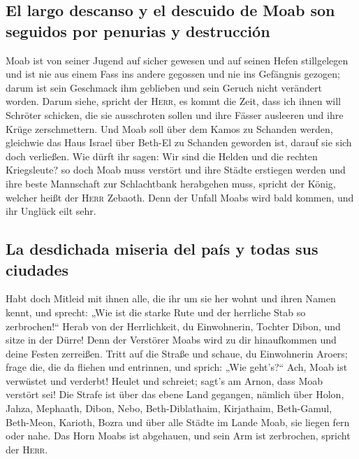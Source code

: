 \hypertarget{el-largo-descanso-y-el-descuido-de-moab-son-seguidos-por-penurias-y-destrucciuxf3n}{%
\subsection{El largo descanso y el descuido de Moab son seguidos por
penurias y
destrucción}\label{el-largo-descanso-y-el-descuido-de-moab-son-seguidos-por-penurias-y-destrucciuxf3n}}

 Moab ist von seiner Jugend auf sicher gewesen und auf
seinen Hefen stillgelegen und ist nie aus einem Fass ins andere gegossen
und nie ins Gefängnis gezogen; darum ist sein Geschmack ihm geblieben
und sein Geruch nicht verändert worden.  Darum siehe,
spricht der \textsc{Herr}, es kommt die Zeit, dass ich ihnen will
Schröter schicken, die sie ausschroten sollen und ihre Fässer ausleeren
und ihre Krüge zerschmettern.  Und Moab soll über dem
Kamos zu Schanden werden, gleichwie das Haus Israel über Beth-El zu
Schanden geworden ist, darauf sie sich doch verließen. 
Wie dürft ihr sagen: Wir sind die Helden und die rechten Kriegsleute?
 so doch Moab muss verstört und ihre Städte erstiegen
werden und ihre beste Mannschaft zur Schlachtbank herabgehen muss,
spricht der König, welcher heißt der \textsc{Herr} Zebaoth.
 Denn der Unfall Moabs wird bald kommen, und ihr Unglück
eilt sehr.

\hypertarget{la-desdichada-miseria-del-pauxeds-y-todas-sus-ciudades}{%
\subsection{La desdichada miseria del país y todas sus
ciudades}\label{la-desdichada-miseria-del-pauxeds-y-todas-sus-ciudades}}

 Habt doch Mitleid mit ihnen alle, die ihr um sie her
wohnt und ihren Namen kennt, und sprecht: „Wie ist die starke Rute und
der herrliche Stab so zerbrochen!{}``  Herab von der
Herrlichkeit, du Einwohnerin, Tochter Dibon, und sitze in der Dürre!
Denn der Verstörer Moabs wird zu dir hinaufkommen und deine Festen
zerreißen.  Tritt auf die Straße und schaue, du
Einwohnerin Aroers; frage die, die da fliehen und entrinnen, und sprich:
„Wie geht's?{}``  Ach, Moab ist verwüstet und verderbt!
Heulet und schreiet; sagt's am Arnon, dass Moab verstört sei!
 Die Strafe ist über das ebene Land gegangen, nämlich
über Holon, Jahza, Mephaath,  Dibon, Nebo,
Beth-Diblathaim,  Kirjathaim, Beth-Gamul, Beth-Meon,
 Karioth, Bozra und über alle Städte im Lande Moab, sie
liegen fern oder nahe.  Das Horn Moabs ist abgehauen, und
sein Arm ist zerbrochen, spricht der \textsc{Herr}.

